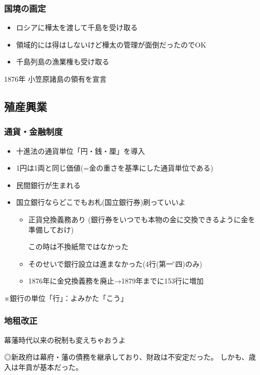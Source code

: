 \documentclass[12pt,fleqn]{ltjsarticle}
\begin{document}
\subsubsection{国境の画定}
\begin{itemize}
\item ロシアに樺太を渡して千島を受け取る
\item 領域的には得はしないけど樺太の管理が面倒だったのでOK
\item 千島列島の漁業権も受け取る
\end{itemize}
 
1876年 小笠原諸島の領有を宣言

\subsection{殖産興業}
\subsubsection{通貨・金融制度}
\begin{itemize}
\item 十進法の通貨単位「円・銭・厘」を導入
\item 1円は1両と同じ価値(=金の重さを基準にした通貨単位である)
\end{itemize}
\begin{itemize}
\item 民間銀行が生まれる
\item 国立銀行ならどこでもお札(国立銀行券)刷っていいよ
\begin{itemize}
\item 正貨兌換義務あり
(銀行券をいつでも本物の金に交換できるように金を準備しておけ)

この時は不換紙幣ではなかった
\item そのせいで銀行設立は進まなかった(4行(第一\~第四)のみ)
\item 1876年に金兌換義務を廃止→1879年までに153行に増加
\end{itemize}
\end{itemize}
※銀行の単位「行」：よみかた「こう」

\subsubsection{地租改正}
幕藩時代以来の税制も変えちゃおうよ

◎新政府は幕府・藩の債務を継承しており、財政は不安定だった。
しかも、歳入は年貢が基本だった。
\end{document}
